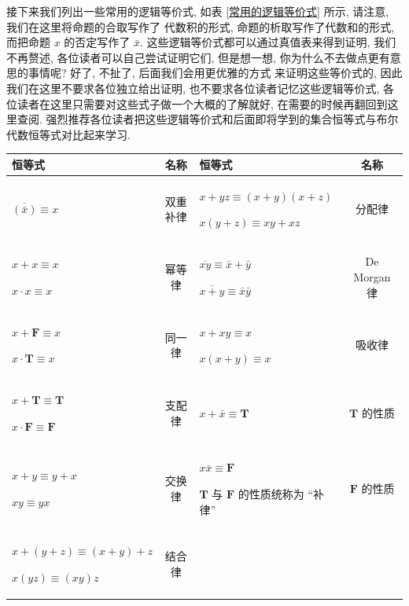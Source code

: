 \documentclass[10pt,UTF8]{book} %
\begin{document}
接下来我们列出一些常用的逻辑等价式, 如表 \ref{常用的逻辑等价式} 所示, 请注意, 我们在这里将命题的合取写作了
代数积的形式, 命题的析取写作了代数和的形式, 而把命题 $x$ 的否定写作了 $\bar x$.
这些逻辑等价式都可以通过真值表来得到证明, 我们不再赘述, 各位读者可以自己尝试证明它们,
但是想一想, 你为什么不去做点更有意思的事情呢? 好了, 不扯了, 后面我们会用更优雅的方式
来证明这些等价式的, 因此我们在这里不要求各位独立给出证明, 也不要求各位读者记忆这些逻辑等价式,
各位读者在这里只需要对这些式子做一个大概的了解就好, 在需要的时候再翻回到这里查阅. 
强烈推荐各位读者把这些逻辑等价式和后面即将学到的集合恒等式与布尔代数恒等式对比起来学习.

{ %
\label{常用的逻辑等价式} %
\begin{longtable}{p{}|c||p{}|c}
    \toprule
    \textbf{恒等式} & \textbf{名称} & \textbf{恒等式} & \textbf{名称} \\

    \midrule
    \endhead
    \bottomrule
    \endfoot

        $\overline{\left(\bar x\right)}  \equiv  x$ & 双重补律 & $x + yz  \equiv  (x+y)(x+z)$
        
        $x(y+z)  \equiv  xy+xz$& 分配律\\
        \hline
        $x+x  \equiv  x$ 

        $x \cdot x  \equiv  x$ & 幂等律 & $\overline{xy}  \equiv  \bar x + \bar y$

        $\overline{x+y} \equiv \bar x \bar y$ & De Morgan 律 \\ 
        \hline
        $x+\mathbf{F}  \equiv  x$

        $x \cdot \mathbf{T}  \equiv  x$ & 同一律 & $x + xy \equiv x$

        $x(x+y) \equiv x$ & 吸收律 \\
        \hline 
        $x + \mathbf{T} \equiv \mathbf{T}$ 

        $x \cdot \mathbf{F} \equiv \mathbf{F}$ & 支配律 & $x + \bar x \equiv \mathbf{T}$ & $\mathbf{T}$ 的性质 \\ 
        \hline 
        $x+y \equiv y+x$

        $xy \equiv yx$ & 交换律 & $x\bar x \equiv \mathbf{F}$ 
        
        $\mathbf{T}$ 与 $\mathbf{F}$ 的性质统称为 “补律” & $\mathbf{F}$ 的性质 \\ 
        \hline 
        $x+(y+z) \equiv (x+y)+z$ 

        $x(yz) \equiv (xy)z$ & 结合律 & & \\ 
\end{longtable}}
\end{document}
